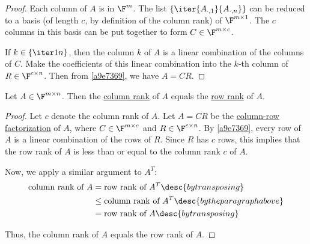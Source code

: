\begin{proof}
  Each column of $A$ is in $\F^m$. The list
  $\{\iter{A_{\cdot,1}}{A_{\cdot,n}}\}$ can be reduced to a basis (of length
  $c$, by definition of the column rank) of $\F^{m\times 1}$. The $c$ columns in
  this basis can be put together to form $C\in\F^{m\times c}$.

  If $k\in\{\iter1n\}$, then the column $k$ of $A$ is a linear combination of
  the columns of $C$. Make the coefficients of this linear combination into the
  $k$-th column of $R\in\F^{c\times n}$. Then from \autoref{a9e7369}, we have
  $A=CR$.
\end{proof}

\label{a8e348c}

Let $A\in\F^{m\times n}$. Then the \href{bc27a95}{column rank} of $A$ equals
the \href{bae7bca}{row rank} of $A$.

\begin{proof}
  Let $c$ denote the column rank of $A$. Let $A=CR$ be the
  \href{e75a67d}{column-row factorization} of $A$, where $C\in\F^{m\times c}$
  and $R\in\F^{c\times n}$. By \autoref{a9e7369}, every row of $A$ is a linear
  combination of the rows of $R$. Since $R$ has $c$ rows, this implies that the
  row rank of $A$ is less than or equal to the column rank $c$ of $A$.

  Now, we apply a similar argument to $A^T$:
  \begin{align*}
    \text{column rank of }A &=\text{row rank of }A^T\desc{by transposing}               \\
                            &\leq\text{column rank of }A^T\desc{by the paragraph above} \\
                            &=\text{row rank of }A\desc{by transposing}
  \end{align*}

  Thus, the column rank of $A$ equals the row rank of $A$.
\end{proof}
